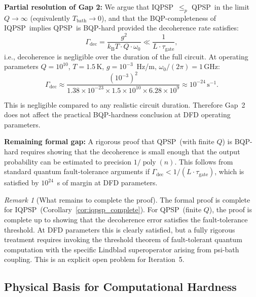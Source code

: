 \documentclass[11pt]{article}
\theoremstyle{definition}
\theoremstyle{remark}
\newtheorem{remark}[theorem]{Remark}
\newcommand{\kB}{k_{\mathrm{B}}}
\newcommand{\QPSP}{\textsc{QPSP}}
\newcommand{\IQPSP}{\textsc{IQPSP}}
\DeclareMathOperator{\poly}{poly}
\begin{document}
\textbf{Partial resolution of Gap 2:} We argue that \IQPSP\ $\leq_p$ \QPSP\
in the limit $Q \to \infty$ (equivalently $T_{\mathrm{bath}} \to 0$),
and that the BQP-completeness of \IQPSP\ implies \QPSP\ is BQP-hard
provided the decoherence rate satisfies:
\begin{equation}
\Gamma_{\mathrm{dec}} = \frac{g^2}{\kB T \cdot Q \cdot \omega_0}
\ll \frac{1}{L \cdot \tau_{\mathrm{gate}}},
\label{eq:decoherence_condition}
\end{equation}
i.e., decoherence is negligible over the duration of the full circuit.
At operating parameters $Q = 10^{10}$, $T = 1.5\,\mathrm{K}$, $g =
10^{-3}$~Hz/m, $\omega_0/(2\pi) = 1\,\mathrm{GHz}$:
\begin{equation}
\Gamma_{\mathrm{dec}} \approx \frac{(10^{-3})^2}{1.38\times10^{-23}
\times 1.5 \times 10^{10} \times 6.28\times10^9}
\approx 10^{-24}\,\mathrm{s}^{-1}.
\label{eq:gamma_dec_numerical}
\end{equation}

This is negligible compared to any realistic circuit duration. Therefore
Gap~2 does not affect the practical BQP-hardness conclusion at DFD
operating parameters.

\textbf{Remaining formal gap:} A rigorous proof that \QPSP\ (with finite
$Q$) is BQP-hard requires showing that the decoherence is small enough
that the output probability can be estimated to precision $1/\poly(n)$.
This follows from standard quantum fault-tolerance arguments if
$\Gamma_{\mathrm{dec}} < 1/(L \cdot \tau_{\mathrm{gate}})$, which is
satisfied by $10^{24}$~s of margin at DFD parameters.

\begin{remark}[What remains to complete the proof]
The formal proof is complete for \IQPSP\ (Corollary~\ref{cor:iqpsp_complete}).
For \QPSP\ (finite $Q$), the proof is complete up to showing that the
decoherence error satisfies the fault-tolerance threshold. At DFD
parameters this is clearly satisfied, but a fully rigorous treatment
requires invoking the threshold theorem of fault-tolerant quantum
computation with the specific Lindblad superoperator arising from
psi-bath coupling. This is an explicit open problem for Iteration~5.
\end{remark}

\subsection{Physical Basis for Computational Hardness}
\label{sec:physical_hardness}
\end{document}
